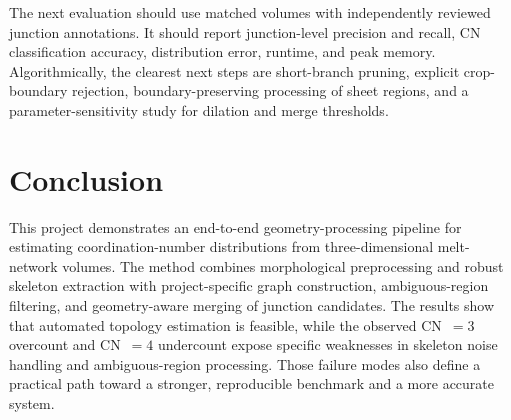 \documentclass[11pt,letterpaper]{article}
\begin{document}
The next evaluation should use matched volumes with independently reviewed junction annotations. It should report junction-level precision and recall, CN classification accuracy, distribution error, runtime, and peak memory. Algorithmically, the clearest next steps are short-branch pruning, explicit crop-boundary rejection, boundary-preserving processing of sheet regions, and a parameter-sensitivity study for dilation and merge thresholds.

\section{Conclusion}

This project demonstrates an end-to-end geometry-processing pipeline for estimating coordination-number distributions from three-dimensional melt-network volumes. The method combines morphological preprocessing and robust skeleton extraction with project-specific graph construction, ambiguous-region filtering, and geometry-aware merging of junction candidates. The results show that automated topology estimation is feasible, while the observed CN~$=3$ overcount and CN~$=4$ undercount expose specific weaknesses in skeleton noise handling and ambiguous-region processing. Those failure modes also define a practical path toward a stronger, reproducible benchmark and a more accurate system.



\end{document}
